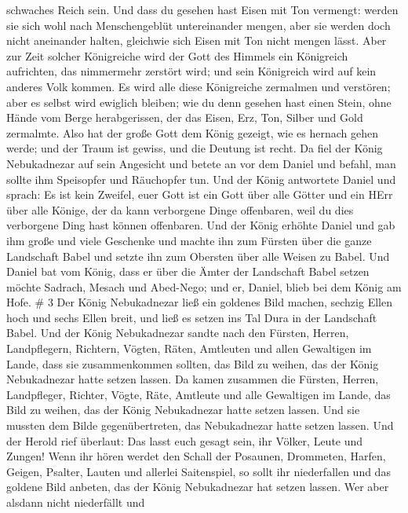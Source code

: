schwaches Reich sein.  Und dass du gesehen hast Eisen mit
Ton vermengt: werden sie sich wohl nach Menschengeblüt untereinander
mengen, aber sie werden doch nicht aneinander halten, gleichwie sich
Eisen mit Ton nicht mengen lässt.  Aber zur Zeit solcher
Königreiche wird der Gott des Himmels ein Königreich aufrichten, das
nimmermehr zerstört wird; und sein Königreich wird auf kein anderes Volk
kommen. Es wird alle diese Königreiche zermalmen und verstören; aber es
selbst wird ewiglich bleiben;  wie du denn gesehen hast
einen Stein, ohne Hände vom Berge herabgerissen, der das Eisen, Erz,
Ton, Silber und Gold zermalmte. Also hat der große Gott dem König
gezeigt, wie es hernach gehen werde; und der Traum ist gewiss, und die
Deutung ist recht.  Da fiel der König Nebukadnezar auf sein
Angesicht und betete an vor dem Daniel und befahl, man sollte ihm
Speisopfer und Räuchopfer tun.  Und der König antwortete
Daniel und sprach: Es ist kein Zweifel, euer Gott ist ein Gott über alle
Götter und ein HErr über alle Könige, der da kann verborgene Dinge
offenbaren, weil du dies verborgene Ding hast können offenbaren.
 Und der König erhöhte Daniel und gab ihm große und viele
Geschenke und machte ihn zum Fürsten über die ganze Landschaft Babel und
setzte ihn zum Obersten über alle Weisen zu Babel.  Und
Daniel bat vom König, dass er über die Ämter der Landschaft Babel setzen
möchte Sadrach, Mesach und Abed-Nego; und er, Daniel, blieb bei dem
König am Hofe. \# 3  Der König Nebukadnezar ließ ein
goldenes Bild machen, sechzig Ellen hoch und sechs Ellen breit, und ließ
es setzen ins Tal Dura in der Landschaft Babel.  Und der
König Nebukadnezar sandte nach den Fürsten, Herren, Landpflegern,
Richtern, Vögten, Räten, Amtleuten und allen Gewaltigen im Lande, dass
sie zusammenkommen sollten, das Bild zu weihen, das der König
Nebukadnezar hatte setzen lassen.  Da kamen zusammen die
Fürsten, Herren, Landpfleger, Richter, Vögte, Räte, Amtleute und alle
Gewaltigen im Lande, das Bild zu weihen, das der König Nebukadnezar
hatte setzen lassen. Und sie mussten dem Bilde gegenübertreten, das
Nebukadnezar hatte setzen lassen.  Und der Herold rief
überlaut: Das lasst euch gesagt sein, ihr Völker, Leute und Zungen!
 Wenn ihr hören werdet den Schall der Posaunen, Drommeten,
Harfen, Geigen, Psalter, Lauten und allerlei Saitenspiel, so sollt ihr
niederfallen und das goldene Bild anbeten, das der König Nebukadnezar
hat setzen lassen.  Wer aber alsdann nicht niederfällt und
